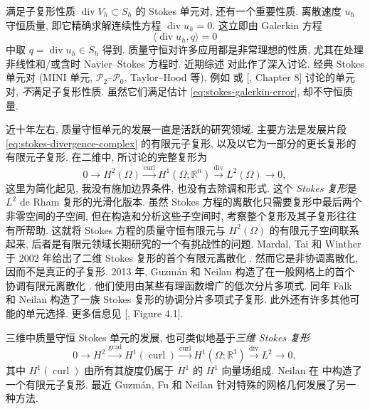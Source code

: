 满足子复形性质 $\operatorname{div}V_h\subset S_h$ 的 Stokes 单元对, 还有一个重要性质. 离散速度 $u_h$ 守恒质量, 即它精确求解连续性方程 $\operatorname{div}u_h=0$. 这立即由 Galerkin 方程
\[
\langle\operatorname{div}u_h,q\rangle=0
\]
中取 $q=\operatorname{div}u_h\in S_h$ 得到. 质量守恒对许多应用都是非常理想的性质, 尤其在处理非线性和/或含时 Navier–Stokes 方程时. 近期综述  对此作了深入讨论. 经典 Stokes 单元对 (MINI 单元, $\mathcal P_2$--$\mathcal P_0$, Taylor–Hood 等), 例如  或 [, Chapter 8] 讨论的单元对, \emph{不}满足子复形性质. 虽然它们满足估计 \eqref{eq:stokes-galerkin-error}, 却不守恒质量.

近十年左右, 质量守恒单元的发展一直是活跃的研究领域. 主要方法是发展片段 \eqref{eq:stokes-divergence-complex} 的有限元子复形, 以及以它为一部分的更长复形的有限元子复形. 在二维中, 所讨论的完整复形为
\[
0\to H^2(\Omega)\xrightarrow{\operatorname{curl}}H^1(\Omega;\mathbb R^n)\xrightarrow{\operatorname{div}}L^2(\Omega)\to0,
\]
这里为简化起见, 我没有施加边界条件, 也没有去除调和形式. 这个 \emph{Stokes 复形}是 $L^2$ de Rham 复形的光滑化版本. 虽然 Stokes 方程的离散化只需要复形中最后两个非零空间的子空间, 但在构造和分析这些子空间时, 考察整个复形及其子复形往往有所帮助. 这就将 Stokes 方程的质量守恒有限元与 $H^2(\Omega)$ 的有限元子空间联系起来, 后者是有限元领域长期研究的一个有挑战性的问题. Mardal, Tai 和 Winther 于 2002 年给出了二维 Stokes 复形的首个有限元离散化 . 然而它是非协调离散化, 因而不是真正的子复形. 2013 年, Guzmán 和 Neilan 构造了在一般网格上的首个协调有限元离散化 . 他们使用由某些有理函数增广的低次分片多项式. 同年 Falk 和 Neilan  构造了一族 Stokes 复形的协调分片多项式子复形. 此外还有许多其他可能的单元选择. 更多信息见 [, Figure 4.1].

三维中质量守恒 Stokes 单元的发展, 也可类似地基于\emph{三维 Stokes 复形}
\[
0\to H^2\xrightarrow{\operatorname{grad}}H^1(\operatorname{curl})\xrightarrow{\operatorname{curl}}H^1(\Omega;\mathbb R^3)\xrightarrow{\operatorname{div}}L^2\to0,
\]
其中 $H^1(\operatorname{curl})$ 由所有其旋度仍属于 $H^1$ 的 $H^1$ 向量场组成. Neilan 在  中构造了一个有限元子复形. 最近 Guzmán, Fu 和 Neilan  针对特殊的网格几何发展了另一种方法.
